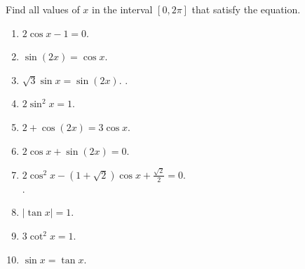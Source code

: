 Find all values of $x$ in the interval $[0,2\pi]$ that satisfy the equation.
\begin{multicols}{2}
\begin{enumerate}[ref={\fcProblemRef}]
\item $2\cos x - 1=0$. \\  
\item $\sin (2x) = \cos x $.  \\ 
\item $\sqrt {3} \sin x= \sin (2x)$.  .
\item $2\sin^2 x= 1$. \\ 
\item $2+\cos (2x) = 3 \cos x$. \\ 
\item $2\cos x +\sin (2x)=0$.\\ 
\item \label{problemSolve2cos^2x-(1+sqrt(2))cosx+sqrt(2)/2=0} $\displaystyle 2\cos^{2}x-(1+\sqrt{2})\cos x+\frac{\sqrt{2}}{2}=0$. \\ .
\item $|\tan x|=1 $. \\ 
\item $3\cot^2 x= 1$. \\ 
\item $\sin x =\tan x$. \\ 
\end{enumerate}
\end{multicols}
